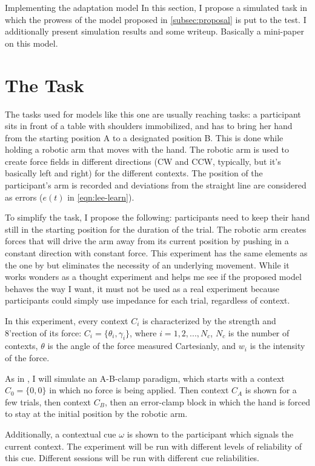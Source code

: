 \documentclass{report}
\begin{document}
\begin{chapter}{Implementing the adaptation model} In this section, I propose a
simulated task in which the prowess of the model proposed in
\ref{subsec:proposal} is put to the test. I additionally present simulation
results and some writeup. Basically a mini-paper on this model.

\section{The Task} The tasks used for models like this one are usually
\citep[e.g.][]{Lee_Dual_2009} reaching tasks: a participant sits in front of a
table with shoulders immobilized, and has to bring her hand from the starting
position A to a designated position B. This is done while holding a robotic arm
that moves with the hand. The robotic arm is used to create force fields in
different directions (CW and CCW, typically, but it's basically left and right)
for the different contexts. The position of the participant's arm is recorded
and deviations from the straight line are considered as errors ($e(t)$ in
\ref{eqn:lee-learn}).

To simplify the task, I propose the following: participants need to keep their
hand still in the starting position for the duration of the trial. The robotic
arm creates forces that will drive the arm away from its current position by
pushing in a constant direction with constant force. This experiment has the
same elements as the one by \cite{Lee_Dual_2009} but eliminates the necessity
of an underlying movement. While it works wonders as a thought experiment and
helps me see if the proposed model behaves the way I want, it must not be used
as a real experiment because participants could simply use impedance for each
trial, regardless of context.

In this experiment, every context $C_i$ is characterized by the strength and
8'rection of its force: $C_i = \{\theta_i, \gamma_i\}$, where $i = 1, 2, ...,
N_c$, $N_c$ is the number of contexts, $\theta$ is the angle of the force
measured Cartesianly, and $w_i$ is the intensity of the force.

As in \cite{Lee_Dual_2009}, I will simulate an A-B-clamp paradigm, which starts
with a context $C_0 = \{0, 0\}$ in which no force is being applied. Then
context $C_A$ is shown for a few trials, then context $C_B$, then an
error-clamp block in which the hand is forced to stay at the initial position
by the robotic arm.

Additionally, a contextual cue $\omega$ is shown to the participant which
signals the current context. The experiment will be run with different levels
of reliability of this cue. Different sessions will be run with different cue
reliabilities.


\end{chapter}
\end{document}
